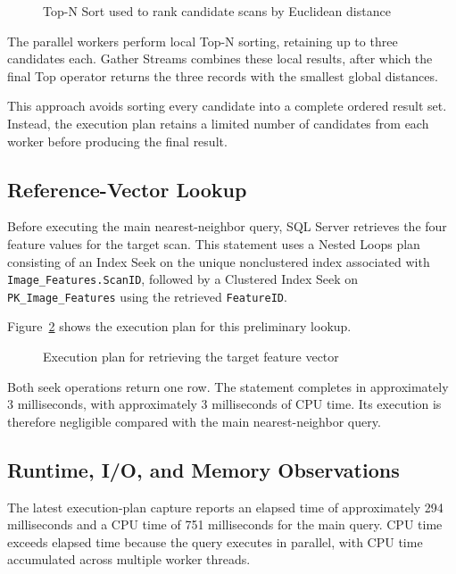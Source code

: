 \begin{figure}[htbp]
\centering
{}
\caption{Top-N Sort used to rank candidate scans by Euclidean distance}
\label{fig:q3-sort}
\end{figure}

The parallel workers perform local Top-N sorting, retaining up to three candidates each. Gather Streams combines these local results, after which the final Top operator returns the three records with the smallest global distances.

This approach avoids sorting every candidate into a complete ordered result set. Instead, the execution plan retains a limited number of candidates from each worker before producing the final result.

\subsection{Reference-Vector Lookup}

Before executing the main nearest-neighbor query, SQL Server retrieves the four feature values for the target scan. This statement uses a Nested Loops plan consisting of an Index Seek on the unique nonclustered index associated with \texttt{Image\_Features.ScanID}, followed by a Clustered Index Seek on \texttt{PK\_Image\_Features} using the retrieved \texttt{FeatureID}.

Figure~\ref{fig:q3-lookup} shows the execution plan for this preliminary lookup.

\begin{figure}[htbp]
\centering
{}
\caption{Execution plan for retrieving the target feature vector}
\label{fig:q3-lookup}
\end{figure}

Both seek operations return one row. The statement completes in approximately 3 milliseconds, with approximately 3 milliseconds of CPU time. Its execution is therefore negligible compared with the main nearest-neighbor query.

\subsection{Runtime, I/O, and Memory Observations}

The latest execution-plan capture reports an elapsed time of approximately 294 milliseconds and a CPU time of 751 milliseconds for the main query. CPU time exceeds elapsed time because the query executes in parallel, with CPU time accumulated across multiple worker threads.


